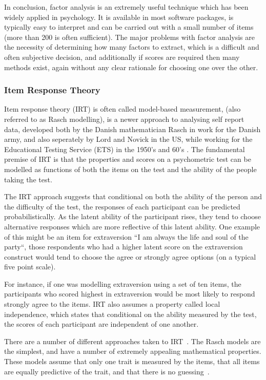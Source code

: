 In conclusion, factor analysis is an extremely useful technique which has been widely applied in psychology. It is available in most software packages, is typically easy to interpret and can be carried out with a small number of items (more than 200 is often sufficient). The major problems with factor analysis are the necessity of determining how many factors to extract, which is a difficult and often subjective decision, and additionally if scores are required then many methods exist, again without any clear rationale for choosing one over the other.  

\subsubsection{Item Response Theory}
\label{sec:item-response-theory}
Item response theory (IRT) is often called model-based measurement\cite{fischer1995rasch}, (also referred to as Rasch modelling), is a newer approach to analysing self report data, developed both by the Danish mathematician Rasch in work for the Danish army, and also seperately by Lord and Novick in the US, while working for the Educational Testing Service (ETS) in the 1950's and 60's \cite{van1997handbook}.
The fundamental premise of IRT is that the properties and scores on a psychometric test can be modelled as functions of both the items on the test and the ability of the people taking the test.

The IRT approach suggests that conditional on both the ability of the person and the difficulty of the test, the responses of each participant can be predicted probabilistically. As the latent ability of the participant rises, they tend to choose alternative responses which are more reflective of this latent ability. One example of this might be an item for extraversion ``I am always the life and soul of the party``, those respondents who had a higher latent score on the extraversion construct would tend to choose the agree or strongly agree options (on a typical five point scale). 

For instance, if one was modelling extraversion using a set of ten items, the participants who scored highest in extraversion would be most likely to respond strongly agree to the items.  IRT also assumes a property called local independence, which states that conditional on the ability measured by the test, the scores of each participant are independent of one another.

There are a number of different approaches taken to IRT~\cite{van1997handbook,fischer1995rasch}. The  Rasch models are the simplest, and have a number of extremely appealing mathematical properties. These models assume that only one trait is measured by the items, that all items are equally predictive of the trait, and that there is no guessing~\cite{van1997handbook}.

